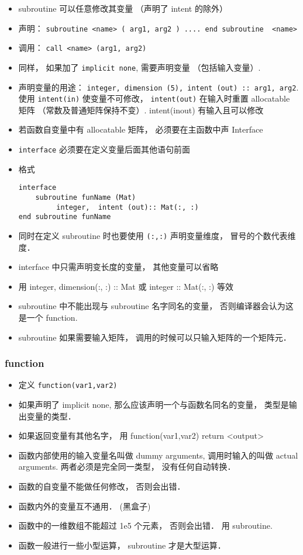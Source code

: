 \begin{itemize}
\item subroutine 可以任意修改其变量 （声明了 intent 的除外）
\item 声明： \verb`subroutine <name> ( arg1, arg2 ) .... end subroutine  <name>`
\item 调用：  \verb`call <name> (arg1, arg2)`
\item 同样， 如果加了 \verb`implicit none`,  需要声明变量 （包括输入变量）.
\item 声明变量的用途： \verb`integer, dimension (5), intent (out) :: arg1, arg2`. 使用 \verb`intent(in)` 使变量不可修改， \verb`intent(out)` 在输入时重置 allocatable 矩阵 （常数及普通矩阵保持不变）. intent(inout) 有输入且可以修改
\item 若函数自变量中有 allocatable 矩阵， 必须要在主函数中声 Interface
\item \verb`interface` 必须要在定义变量后面其他语句前面
\item 格式
\begin{lstlisting}
interface
    subroutine funName (Mat)
         integer,  intent (out):: Mat(:, :)
end subroutine funName
\end{lstlisting}
\item 同时在定义 subroutine 时也要使用 \verb`(:,:)` 声明变量维度， 冒号的个数代表维度．
\item interface 中只需声明变长度的变量， 其他变量可以省略
\item 用 integer, dimension(:, :) :: Mat 或 integer :: Mat(:, :) 等效
\item subroutine 中不能出现与 subroutine 名字同名的变量， 否则编译器会认为这是一个 function.
\item subroutine 如果需要输入矩阵， 调用的时候可以只输入矩阵的一个矩阵元．
\end{itemize}

\subsubsection{function}
\begin{itemize}
\item 定义 \verb`function(var1,var2)`
\item 如果声明了 implicit none, 那么应该声明一个与函数名同名的变量， 类型是输出变量的类型．
\item 如果返回变量有其他名字， 用 function(var1,var2) return <output>
\item 函数内部使用的输入变量名叫做 dummy arguments, 调用时输入的叫做 actual arguments. 两者必须是完全同一类型， 没有任何自动转换．
\item 函数的自变量不能做任何修改， 否则会出错．
\item 函数内外的变量互不通用． (黑盒子)
\item 函数中的一维数组不能超过 1e5 个元素， 否则会出错． 用 subroutine.
\item 函数一般进行一些小型运算， subroutine 才是大型运算．
\end{itemize}

